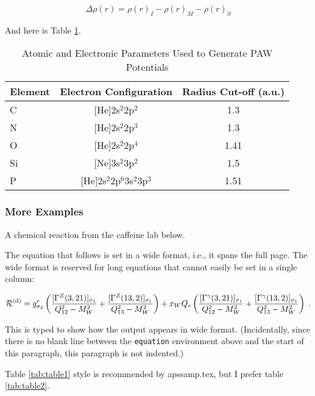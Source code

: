 \documentclass[letterpaper,amsmath,amssymb,prb,preprint,12pt]{revtex4-1}%
\begin{document}
\[\Delta\rho(r)=\rho(r)_{I}-\rho(r)_{M}-\rho(r)_{S}\]

And here is Table \ref{paw}.

\begin{table}[h]
\caption{Atomic and Electronic Parameters Used to Generate PAW Potentials}
\begin{tabular}{l@{\qquad}c@{\qquad}c}
\hline
Element&Electron Configuration&Radius Cut-off (a.u.)\\
\hline
\hline
C & [He]2s$^{2}$2p$^{2}$ & 1.3 \\
N & [He]2s$^{2}$2p$^{3}$ & 1.3 \\
O & [He]2s$^{2}$2p$^{4}$ & 1.41 \\
Si & [Ne]3s$^{2}$3p$^{2}$ & 1.5 \\
P & [He]2s$^{2}$2p$^{6}$3s$^{2}$3p$^{3}$ & 1.51 \\
\hline
\end{tabular}
\label{paw}
\end{table}

\subsubsection{More Examples}

A chemical reaction from the caffeine lab below.


The equation that follows is set in a wide format, i.e., it spans the full page. 
The wide format is reserved for long equations
that cannot easily be set in a single column:
\begin{widetext}
\begin{equation}
{\cal R}^{(\text{d})}=
 g_{\sigma_2}^e
 \left(
   \frac{[\Gamma^Z(3,21)]_{\sigma_1}}{Q_{12}^2-M_W^2}
  +\frac{[\Gamma^Z(13,2)]_{\sigma_1}}{Q_{13}^2-M_W^2}
 \right)
 + x_WQ_e
 \left(
   \frac{[\Gamma^\gamma(3,21)]_{\sigma_1}}{Q_{12}^2-M_W^2}
  +\frac{[\Gamma^\gamma(13,2)]_{\sigma_1}}{Q_{13}^2-M_W^2}
 \right)\;. 
 \label{eq:wideeq}
\end{equation}
\end{widetext}
This is typed to show how the output appears in wide format.
(Incidentally, since there is no blank line between the \texttt{equation} environment above 
and the start of this paragraph, this paragraph is not indented.)

Table \ref{tab:table1} style is recommended by apssamp.tex, but I prefer table \ref{tab:table2}.
\end{document}
